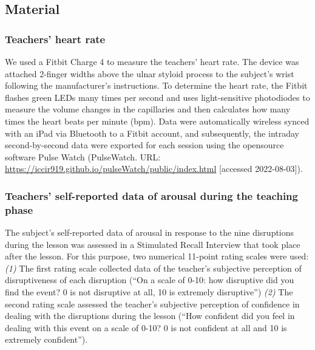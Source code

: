 \documentclass[
  man,floatsintext]{apa6}
\begin{document}
\hypertarget{material}{%
\subsection{Material}\label{material}}

\hypertarget{teachers-heart-rate}{%
\subsubsection{Teachers' heart rate}\label{teachers-heart-rate}}

We used a Fitbit Charge 4 to measure the teachers' heart rate. The device was attached 2-finger widths above the ulnar styloid process to the subject's wrist following the manufacturer's instructions. To determine the heart rate, the Fitbit flashes green LEDs many times per second and uses light-sensitive photodiodes to measure the volume changes in the capillaries and then calculates how many times the heart beats per minute (bpm). Data were automatically wireless synced with an iPad via Bluetooth to a Fitbit account, and subsequently, the intraday second-by-second data were exported for each session using the opensource software Pulse Watch (PulseWatch. URL: \url{https://iccir919.github.io/pulseWatch/public/index.html} {[}accessed 2022-08-03{]}).

\hypertarget{teachers-self-reported-data-of-arousal-during-the-teaching-phase}{%
\subsubsection{Teachers' self-reported data of arousal during the teaching phase}\label{teachers-self-reported-data-of-arousal-during-the-teaching-phase}}

The subject's self-reported data of arousal in response to the nine disruptions during the lesson was assessed in a Stimulated Recall Interview that took place after the lesson. For this purpose, two numerical 11-point rating scales were used: \emph{(1)} The first rating scale collected data of the teacher's subjective perception of disruptiveness of each disruption (``On a scale of 0-10: how disruptive did you find the event? 0 is not disruptive at all, 10 is extremely disruptive'') \emph{(2)} The second rating scale assessed the teacher's subjective perception of confidence in dealing with the disruptions during the lesson (``How confident did you feel in dealing with this event on a scale of 0-10? 0 is not confident at all and 10 is extremely confident'').
\end{document}
